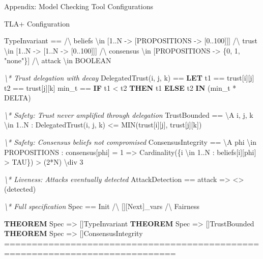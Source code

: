 \documentclass[
  ignorenonframetext,
]{beamer}
\newenvironment{Shaded}{}{}
\newcommand{\CommentTok}[1]{\textcolor[rgb]{0.38,0.63,0.69}{\textit{#1}}}
\newcommand{\DecValTok}[1]{\textcolor[rgb]{0.25,0.63,0.44}{#1}}
\newcommand{\KeywordTok}[1]{\textcolor[rgb]{0.00,0.44,0.13}{\textbf{#1}}}
\newcommand{\NormalTok}[1]{#1}
\newcommand{\StringTok}[1]{\textcolor[rgb]{0.25,0.44,0.63}{#1}}
\newcounter{none} %
\begin{document}
\begin{frame}[fragile]{Appendix: Model Checking Tool Configurations}
\begin{block}{TLA+ Configuration}
\begin{Shaded}
\begin{Highlighting}[]
\NormalTok{TypeInvariant ==}
\NormalTok{  /\textbackslash{} beliefs \textbackslash{}in [}\DecValTok{1}\NormalTok{..N {-}\textgreater{} [PROPOSITIONS {-}\textgreater{} [}\DecValTok{0}\NormalTok{..}\DecValTok{100}\NormalTok{]]]}
\NormalTok{  /\textbackslash{} trust \textbackslash{}in [}\DecValTok{1}\NormalTok{..N {-}\textgreater{} [}\DecValTok{1}\NormalTok{..N {-}\textgreater{} [}\DecValTok{0}\NormalTok{..}\DecValTok{100}\NormalTok{]]]}
\NormalTok{  /\textbackslash{} consensus \textbackslash{}in [PROPOSITIONS {-}\textgreater{} \{}\DecValTok{0}\NormalTok{, }\DecValTok{1}\NormalTok{, }\StringTok{"none"}\NormalTok{\}]}
\NormalTok{  /\textbackslash{} attack \textbackslash{}in BOOLEAN}

\CommentTok{\textbackslash{}* Trust delegation with decay}
\NormalTok{DelegatedTrust(i, j, k) ==}
  \KeywordTok{LET}\NormalTok{ t1 == trust[i][j]}
\NormalTok{      t2 == trust[j][k]}
\NormalTok{      min\_t == }\KeywordTok{IF}\NormalTok{ t1 \textless{} t2 }\KeywordTok{THEN}\NormalTok{ t1 }\KeywordTok{ELSE}\NormalTok{ t2}
  \KeywordTok{IN}\NormalTok{ (min\_t * DELTA)}

\CommentTok{\textbackslash{}* Safety: Trust never amplified through delegation}
\NormalTok{TrustBounded ==}
\NormalTok{  \textbackslash{}A i, j, k \textbackslash{}in }\DecValTok{1}\NormalTok{..N :}
\NormalTok{    DelegatedTrust(i, j, k) \textless{}= MIN(trust[i][j], trust[j][k])}

\CommentTok{\textbackslash{}* Safety: Consensus beliefs not compromised}
\NormalTok{ConsensusIntegrity ==}
\NormalTok{  \textbackslash{}A phi \textbackslash{}in PROPOSITIONS :}
\NormalTok{    consensus[phi] = }\DecValTok{1}\NormalTok{ =\textgreater{}}
\NormalTok{      Cardinality(\{i \textbackslash{}in }\DecValTok{1}\NormalTok{..N : beliefs[i][phi] \textgreater{} TAU\}) \textgreater{} (}\DecValTok{2}\NormalTok{*N) \textbackslash{}div }\DecValTok{3}

\CommentTok{\textbackslash{}* Liveness: Attacks eventually detected}
\NormalTok{AttackDetection ==}
\NormalTok{  attack =\textgreater{} \textless{}\textgreater{}(detected)}

\CommentTok{\textbackslash{}* Full specification}
\NormalTok{Spec == Init /\textbackslash{} [][Next]\_vars /\textbackslash{} Fairness}

\KeywordTok{THEOREM}\NormalTok{ Spec =\textgreater{} []TypeInvariant}
\KeywordTok{THEOREM}\NormalTok{ Spec =\textgreater{} []TrustBounded}
\KeywordTok{THEOREM}\NormalTok{ Spec =\textgreater{} []ConsensusIntegrity}
\NormalTok{=============================================================================}
\end{Highlighting}
\end{Shaded}
\end{block}


\end{frame}
\end{document}

